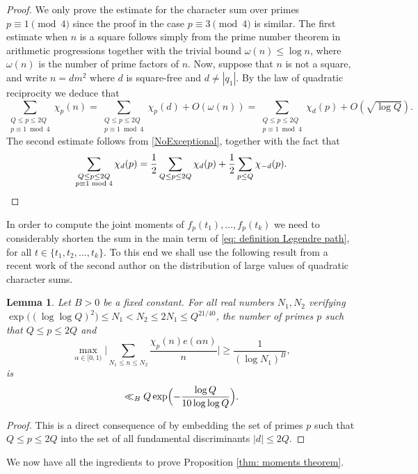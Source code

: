\documentclass[JEP,XML,SOM,Unicode,NoFloatCountersInSection,published]{cedram}
\theoremstyle{plain}
\newtheorem{lem}[thm]{Lemma}
\theoremstyle{definition}
\begin{document}
\begin{proof} We only prove the estimate for the character sum over primes $p\equiv 1 \pmod 4$ since the proof in the case $p\equiv 3 \pmod 4$ is similar.
The first estimate when $n$ is a square follows simply from the prime number theorem in arithmetic progressions together with the trivial bound $\omega(n)\leq \log n$, where $\omega(n)$ is the number of prime factors of $n$. Now, suppose that $n$ is not a square, and write $n=dm^2$ where $d$ is square-free and $d\neq |q_1|$. By the law of quadratic reciprocity we deduce that
\[
\sum_{\substack{Q\leq p\leq 2Q\\ p\equiv 1 \bmod 4}} \chi_p(n)= \sum_{\substack{Q\leq p\leq 2Q\\ p\equiv 1 \bmod 4}}\chi_p(d) + O(\omega(n))= \sum_{\substack{Q\leq p\leq 2Q\\ p\equiv 1 \bmod 4}}\chi_d(p) + O(\sqrt{\log Q}).
\]
The second estimate follows from \eqref{NoExceptional}, together with the fact that
\[\sum_{\substack{Q\leq p\leq 2Q\\ p\equiv 1 \bmod 4}}\chi_d(p)= \frac{1}{2} \sum_{Q\leq p\leq 2Q}\chi_d(p) + \frac{1}{2}\sum_{p\leq Q}\chi_{-d}(p).\qedhere
\]
\end{proof}

In order to compute the joint moments of $f_{p}(t_1), \dots, f_{p}(t_k)$ we need to considerably shorten the sum in the main term of \eqref{eq: definition Legendre path}, for all $t\in \{t_1, t_2, \dots, t_k\}$. To this end we shall use the following result from a recent work of the second author \cite{La} on the distribution of large values of quadratic character sums.

\begin{lem}\label{lem: Tail2} Let $B>0$ be a fixed constant. For all real numbers $N_1, N_2$ verifying $ \exp\big((\log\log Q)^2\big)\leq N_1 < N_2\leq 2N_1\leq Q^{21/40}$, the number of primes $p$ such that $Q\leq p\leq 2Q$ and
\[
\max_{\alpha\in [0, 1)}\biggl|\sum_{N_1\leq n\leq N_2} \frac{\chi_p(n) e(\alpha n)}{n}\biggr|\geq \frac{1}{(\log N_1)^B},
\]
is
\[
\ll_B Q\exp\Bigl(-\frac{\log Q}{10 \log\log Q}\Bigr).\]
\end{lem}
\begin{proof} This is a direct consequence of \cite[Prop.\,4.2 \& 4.3]{La} by embedding the set of primes $p$ such that $Q\leq p\leq 2Q$ into the set of all fundamental discriminants $|d|\leq 2Q$.
\end{proof}

We now have all the ingredients to prove Proposition \ref{thm: moments theorem}.
\end{document}

